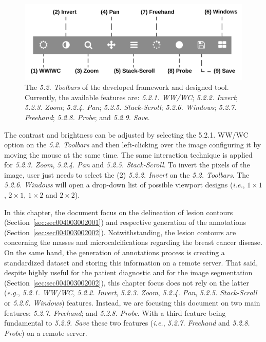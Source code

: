 \begin{figure}[ht]
\centering
\includegraphics[width=\textwidth]{images/fig008}
\caption{The {\it 5.2. Toolbars} of the developed framework and designed tool. Currently, the available features are: {\it 5.2.1. WW/WC}; {\it 5.2.2. Invert}; {\it 5.2.3. Zoom}; {\it 5.2.4. Pan}; {\it 5.2.5. Stack-Scroll}; {\it 5.2.6. Windows}; {\it 5.2.7. Freehand}; {\it 5.2.8. Probe}; and {\it 5.2.9. Save}.}
\label{fig:fig008}
\end{figure}

The contrast and brightness can be adjusted by selecting the {5.2.1. WW/WC} option on the {\it 5.2. Toolbars} and then left-clicking over the image configuring it by moving the mouse at the same time.
The same interaction technique is applied for {\it 5.2.3. Zoom}, {\it 5.2.4. Pan} and  {\it 5.2.5. Stack-Scroll}.
To invert the pixels of the image, user just needs to select the (2) {\it 5.2.2. Invert} on the {\it 5.2. Toolbars}.
The {\it 5.2.6. Windows} will open a drop-down list of possible viewport designs ({\it i.e.}, $1\times 1$, $2\times 1$, $1\times 2$ and $2\times 2$).

In this chapter, the document focus on the delineation of lesion contours (Section~\ref{sec:sec004003002001}) and respective generation of the annotations (Section~\ref{sec:sec004003002002}).
Notwithstanding, the lesion contours are concerning the masses and microcalcifications regarding the breast cancer disease.
On the same hand, the generation of annotations process is creating a standardized dataset and storing this information on a remote server.
That said, despite highly useful for the patient diagnostic and for the image segmentation (Section~\ref{sec:sec004003002002}), this chapter focus does not rely on the latter ({\it e.g.}, {\it 5.2.1. WW/WC}, {\it 5.2.2. Invert}, {\it 5.2.3. Zoom}, {\it 5.2.4. Pan}, {\it 5.2.5. Stack-Scroll} or {\it 5.2.6. Windows}) features.
Instead, we are focusing this document on two main features:
{\it 5.2.7. Freehand}; and
{\it 5.2.8. Probe}. With a third feature being fundamental to {\it 5.2.9. Save} these two features ({\it i.e.}, {\it 5.2.7. Freehand} and {\it 5.2.8. Probe}) on a remote server.

